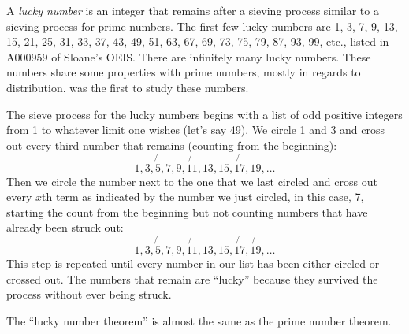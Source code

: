 \documentclass[12pt]{article}
\begin{document}
A {\em lucky number} is an integer that remains after a sieving process similar to a sieving process for prime numbers. The first few lucky numbers are 1, 3, 7, 9, 13, 15, 21, 25, 31, 33, 37, 43, 49, 51, 63, 67, 69, 73, 75, 79, 87, 93, 99, etc., listed in A000959 of Sloane's OEIS. There are infinitely many lucky numbers. These numbers share some properties with prime numbers, mostly in regards to distribution.  was the first to study these numbers.

The sieve process for the lucky numbers begins with a list of odd positive integers from 1 to whatever limit one wishes (let's say 49). We circle 1 and 3 and cross out every third number that remains (counting from the beginning): $$1, 3, \not{5}, 7, 9, \not{11}, 13, 15, \not{17}, 19, \ldots$$ Then we circle the number next to the one that we last circled and cross out every $x$th term as indicated by the number we just circled, in this case, 7, starting the count from the beginning but not counting numbers that have already been struck out: $$1, 3, \not{5}, 7, 9, \not{11}, 13, 15, \not{17}, \not{19}, \ldots$$ This step is repeated until every number in our list has been either circled or crossed out. The numbers that remain are ``lucky'' because they survived the process without ever being struck.

The ``lucky number theorem'' is almost the same as the prime number theorem.
\end{document}
